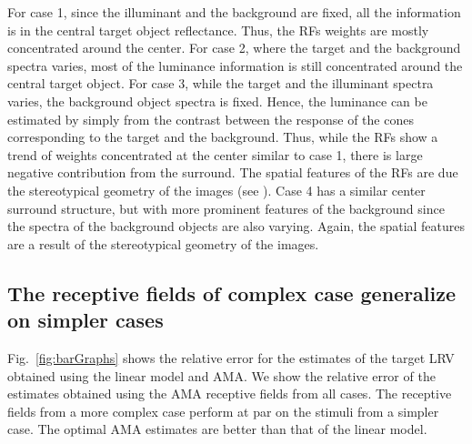 \documentclass{jov}
\begin{document}
For case 1, since the illuminant and the background are fixed, all the information is in the central target object reflectance. Thus, the RFs weights are mostly concentrated around the center. For case 2, where the target and the background spectra varies, most of the luminance information is still concentrated around the central target object. For case 3, while the target and the illuminant spectra varies, the background object spectra is fixed. Hence, the luminance can be estimated by simply from the contrast between the response of the cones corresponding to the target and the background. Thus, while the RFs show a trend of weights concentrated at the center similar to case 1, there is large negative contribution from the surround. The spatial features of the RFs are due the stereotypical geometry of the images (see ). Case 4 has a similar center surround structure, but with more prominent features of the background since the spectra of the background objects are also varying. Again, the spatial features are a result of the stereotypical geometry of the images.

\subsection{The receptive fields of complex case generalize on simpler cases}
Fig.~\ref{fig:barGraphs} shows the relative error for the estimates of the target LRV obtained using the linear model and AMA. We show the relative error of the estimates obtained using the AMA receptive fields from all cases. The receptive fields from a more complex case perform at par on the stimuli from a simpler case. The optimal AMA estimates are better than that of the linear model.
\end{document}
